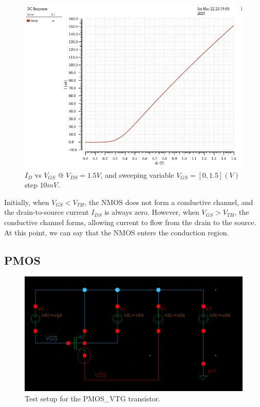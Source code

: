 
\begin{figure}[H]
	\centering
	\includegraphics[width=0.6\linewidth]{sections/pic/EX1_NMOS_Id&Vgs(Vds15).png}
	\caption{$I_D$ vs $V_{GS}$ @ $V_{DS} = 1.5V$, and sweeping variable $V_{GS} = [0, 1.5](V)$ step $10mV$.}
	\label{f_EX1_NMOS_Id&Vgs(Vds15)}
\end{figure}

\begin{discussion}
	\item Initially, when \( V_{GS} < V_{TH} \), the NMOS does not form a conductive channel, and the drain-to-source current \( I_{DS} \) is always zero. However, when \( V_{GS} > V_{TH} \), the conductive channel forms, allowing current to flow from the drain to the source. At this point, we can say that the NMOS enters the conduction region.
\end{discussion}

\subsection{PMOS}
\begin{figure}[H]
	\centering
	\includegraphics[width = 0.6\linewidth]{sections/pic/EX1_PMOS.png}
	\caption{Test setup for the PMOS\_VTG transistor.}
	\label{f_ex1PMOS-schematic}
\end{figure}

